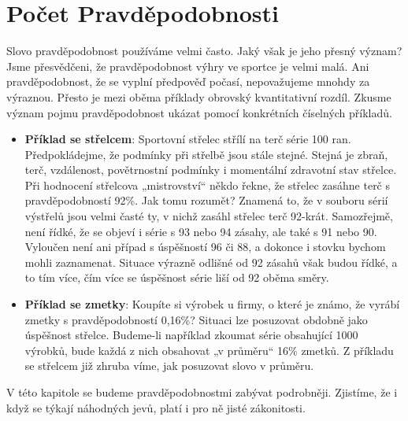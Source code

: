 \chapter{Počet Pravděpodobnosti}\label{mai:IchapIII}
\minitoc
  Slovo pravděpodobnost používáme velmi často. Jaký však je jeho přesný význam? Jsme přesvědčeni, 
  že pravděpodobnost výhry ve sportce je velmi malá. Ani pravděpodobnost, že se vyplní předpověď 
  počasí, nepovažujeme mnohdy za výraznou. Přesto je mezi oběma příklady obrovský kvantitativní 
  rozdíl. Zkusme význam pojmu pravděpodobnost ukázat pomocí konkrétních číselných příkladů.
  
  \begin{itemize}
    \item \textbf{Příklad se střelcem}: Sportovní střelec střílí na terč série \num{100} ran. 
          Předpokládejme, že podmínky při střelbě jsou stále stejné. Stejná je zbraň, terč, 
          vzdálenost, povětrnostní podmínky i momentální zdravotní stav střelce. Při hodnocení 
          střelcova „mistrovství“ někdo řekne, že střelec zasáhne terč s pravděpodobností 
          \num{92}\%. Jak tomu rozumět? Znamená to, že v souboru sérií výstřelů jsou velmi časté 
          ty, v nichž zasáhl střelec terč \num{92}-krát. Samozřejmě, není řídké, že se objeví i 
          série s \num{93} nebo \num{94} zásahy, ale také s \num{91} nebo \num{90}. Vyloučen není 
          ani případ s úspěšností \num{96} či \num{88}, a dokonce i stovku bychom mohli zaznamenat. 
          Situace výrazně odlišné od \num{92} zásahů však budou řídké, a to tím více, čím více se 
          úspěšnost série liší od \num{92} oběma směry.
    \item \textbf{Příklad se zmetky}: Koupíte si výrobek u firmy, o které je známo, že vyrábí 
          zmetky s pravděpodobností 0,16\%? Situaci lze posuzovat obdobně jako úspěšnost střelce. 
          Budeme-li například zkoumat série obsahující 1000 výrobků, bude každá z nich obsahovat „v 
          průměru“ 16\% zmetků. Z příkladu se střelcem již zhruba víme, jak posuzovat slovo v 
          průměru.
  \end{itemize}
  
  V této kapitole se budeme pravděpodobnostmi zabývat podrobněji. Zjistíme, že i když se týkají 
  náhodných jevů, platí i pro ně jisté zákonitosti.
    
